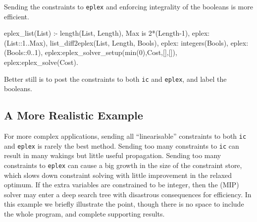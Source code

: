 Sending the constraints to {\tt eplex} and enforcing integrality of
the booleans is more efficient.
\begin{code}
eplex_list(List) :-
        length(List, Length),
        Max is 2*(Length-1),
        eplex: (List::1..Max),
        list_diff2eplex(List, Length, Bools),
        eplex: integers(Bools),
        eplex: (Bools::0..1),
        eplex:eplex_solver_setup(min(0),Cost,[],[]),
        eplex:eplex_solve(Cost).
\end{code}

Better still is to post the constraints to both {\tt ic} and 
{\tt eplex}, 
and label the booleans.

\subsection{A More Realistic Example}
For more complex applications, sending all ``linearisable''
constraints to both {\tt ic} and {\tt eplex} is rarely the best
method.
Sending too many constraints to {\tt ic} can result in many wakings
but little useful propagation.
Sending too many constraints to {\tt eplex} can cause a big growth
in the size of the constraint store, which slows down constraint
solving with little improvement in the relaxed optimum.
If the extra variables are constrained to be integer, then the (MIP)
solver may enter a deep search tree with disastrous consequences for
efficiency.
In this example we briefly illustrate the point, though there is no
space to include the whole program, and complete supporting results.

